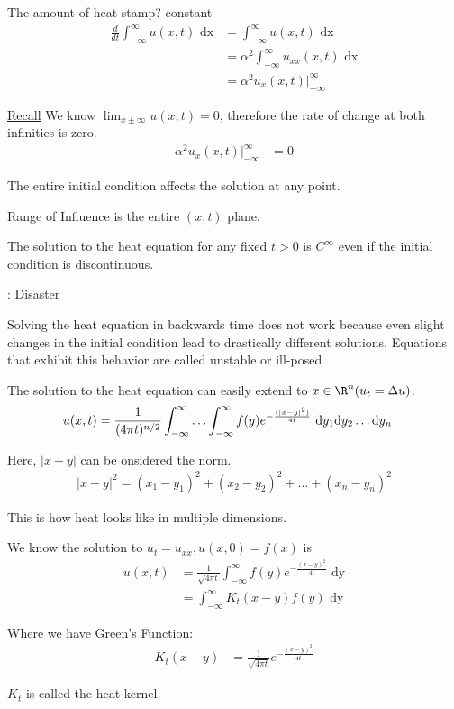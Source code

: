 The amount of heat stamp? constant
%
\begin{align}
  \frac{d}{dt} \int^\infty_{-\infty} u(x, t) \text{ dx}
  & = \int^\infty_{-\infty} u(x, t) \text{ dx}\\
  & = \alpha^2 \int^\infty_{-\infty} u_{xx} (x, t) \text{ dx}\\
  & = \alpha^2 u_x(x, t) \Big|^\infty_{-\infty}
\end{align}

\underline{Recall} We know $\lim_{x \pm \infty} u(x, t) = 0$, therefore the rate of change at both infinities is zero.
%
\begin{align}
  \alpha^2 u_x(x, t) \Big|^\infty_{-\infty} & = 0
\end{align}

\bigbreak


The entire initial condition affects the solution at any point.

Range of Influence is the entire $(x, t)$ plane.

The solution to the heat equation for any fixed $t > 0$ is $C^\infty$ even if the initial condition is discontinuous.

\bigbreak

 : Disaster

Solving the heat equation in backwards time does not work because even slight changes in the initial condition lead to drastically different solutions. Equations that exhibit this behavior are called unstable or ill-posed

\bigbreak


The solution to the heat equation can easily extend to $x \in \R^n (u_t = \Delta u)$.
%
\begin{align}
  u(x, t) & = \frac{1}{(4 \pi t)^{n/2}} \int^\infty_{-\infty} \ldots \int^\infty_{-\infty} f(y) e^{-\frac{(|x - y|^2)}{4t}} \text{ d}y_1 \text dy_2 \ldots \text dy_n
\end{align}

Here, $|x - y|$ can be onsidered the norm.
%
\begin{align}
  |x - y|^2 = (x_1 - y_1)^2 + (x_2 - y_2)^2 + \ldots + (x_n - y_n)^2
\end{align}

This is how heat looks like in multiple dimensions.

\bigbreak

We know the solution to $u_t = u_{xx}, u(x, 0) = f(x)$ is
%
\begin{align}
  u(x, t) & = \frac{1}{\sqrt{4 \pi t}} \int^\infty_{-\infty} f(y) e^{-\frac{(x - y)^2}{4 t}} \text{ dy}\\
  & = \int^\infty_{-\infty} K_t (x - y) f(y) \text{ dy}
\end{align}

Where we have Green's Function:
%
\begin{align}
  K_t(x - y) & = \frac{1}{\sqrt{4 \pi t}} e^{-\frac{(x - y)^2}{4t}}
\end{align}

$K_t$ is called the heat kernel.
